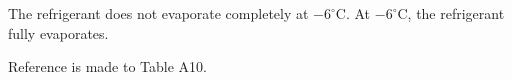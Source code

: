 The refrigerant does not evaporate completely at \(-6^\circ\text{C}\).  
At \(-6^\circ\text{C}\), the refrigerant fully evaporates.  

Reference is made to Table A10.